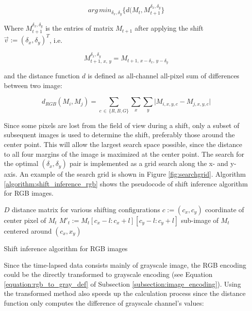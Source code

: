 \documentclass[pdftex,12pt,a4paper]{report}
\begin{document}
$$
arg\,min_{\delta_x, \delta_y} \{d(M_{t}, M_{t + 1}^{\delta_x, \delta_y}\}
$$

Where $M_{t + 1}^{\delta_x, \delta_y}$ is the entries of matrix $M_{t + 1}$ after applying the shift $\vec{v} := (\delta_x, \delta_y)^T$, i.e.

$$M_{t + 1, \, x, \, y}^{\delta_x, \delta_y} = M_{t + 1, \, x - \delta_x, \, y - \delta_y}$$

and the distance function $d$ is defined as all-channel all-pixel sum of differences between two image:

$$
d_{RGB}(M_i, M_j) = \sum_{c \, \in \, \{R, B, G\}} \sum_{x} \sum_{y} \vert M_{i, x, y, c} - M_{j, x, y, c} \vert
$$

Since some pixels are lost from the field of view during a shift, only a subset of subsequent images is used to determine the shift, preferably those around the center point. This will allow the largest search space possible, since the distance to all four margins of the image is maximized at the center point. The search for the optimal $(\delta_x, \delta_y)$ pair is implemented as a grid search along the x- and y-axis. An example of the search grid is shown in Figure \ref{fig:searchgrid}. Algorithm \ref{algorithm:shift_inference_rgb} shows the pseudocode of shift inference algorithm for RGB images.

\vspace{10mm}

\begin{algorithm}[H]
 $D$ distance matrix for various shifting configurations \;
 $c := (c_x, c_y)$ coordinate of center pixel of $M_t$ \;
 $M'_t  := M_{t}[c_x - l:c_x +l][c_y - l:c_y +l]$ sub-image of $M_t$ centered around $(c_x, x_y)$\;
 \vline
\caption{Shift inference algorithm for RGB images}
\label{algorithm:shift_inference_rgb}
\end{algorithm}

\vspace{10mm}

Since the time-lapsed data consists mainly of grayscale image, the RGB encoding could be the directly transformed to grayscale encoding (see Equation \ref{equation:rgb_to_gray_def} of Subsection \ref{subsection:image_encoding}). Using the transformed method also speeds up the calculation process since the distance function only computes the difference of grayscale channel's values:
\end{document}
